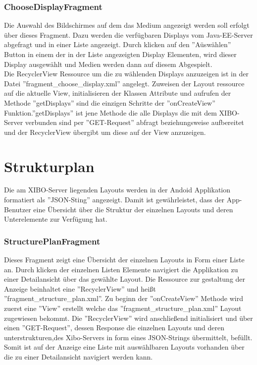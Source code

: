 \subsubsection{ChooseDisplayFragment}
Die Auswahl des Bildschirmes auf dem das Medium angezeigt werden soll erfolgt über dieses Fragment. Dazu werden die verfügbaren Displays vom Java-EE-Server abgefragt und in einer Liste angezeigt. Durch klicken auf den ''Aüswählen'' Button in einem der in der Liste angezeigten Display Elementen, wird dieser Display ausgewählt und Medien werden dann auf diesem Abgespielt. 
\\
Die RecyclerView Ressource um die zu wählenden Displays anzuzeigen ist in der Datei ''fragment\_choose\_display.xml'' angelegt. Zuweisen der Layout ressource auf die aktuelle View, initialisieren der Klassen Attribute und aufrufen der Methode ''getDisplays'' sind die einzigen Schritte der ''onCreateView'' Funktion.''getDisplays'' ist jene Methode die alle Displays die mit dem XIBO-Server verbunden sind per ''GET-Request'' abfragt beziehungsweise aufbereitet und der RecyclerView übergibt um diese auf der View anzuzeigen. 
\section{Strukturplan}
Die am XIBO-Server liegenden Layouts werden in der Andoid Applikation formatiert als ''JSON-Sting'' angezeigt. Damit ist gewährleistet, dass der App-Benutzer eine Übersicht über die Struktur der einzelnen Layouts und deren Unterelemente zur Verfügung hat.
\subsubsection{StructurePlanFragment}
Dieses Fragment zeigt eine Übersicht der einzelnen Layouts in Form einer Liste an. Durch klicken der einzelnen Listen Elemente navigiert die Applikation zu einer Detailansicht über das gewählte Layout.
Die Ressource zur gestaltung der Anzeige beinhaltet eine ''RecyclerView'' und heißt ''fragment\_structure\_plan.xml''. Zu beginn der ''onCreateView'' Methode wird zuerst eine ''View'' erstellt welche das ''fragment\_structure\_plan.xml'' Layout zugewiesen bekommt. Die ''RecyclerView'' wird anschließend initialisiert und über einen ''GET-Request'', dessen Response die einzelnen Layouts und deren unterstrukturen,des Xibo-Servers in form eines JSON-Strings übermittelt, befüllt. Somit ist auf der Anzeige eine Liste mit auswählbaren Layouts vorhanden über die zu einer Detailansicht navigiert werden kann. 
